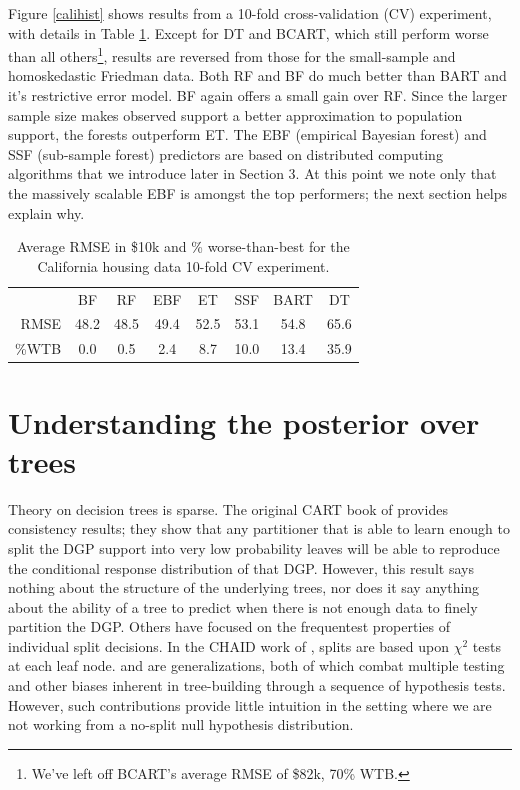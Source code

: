 \documentclass{article}
\begin{document}
Figure \ref{calihist} shows results from a 10-fold cross-validation (CV)
experiment, with details in Table \ref{calitab}.  
Except for DT and BCART, which still perform worse than all 
others\footnote{We've left off BCART's average RMSE of \$82k, 70\% WTB.},
 results are reversed from those for the small-sample and homoskedastic Friedman data.
Both RF and BF do much better than BART and it's
restrictive error model.   BF again offers a small
gain over RF.   Since the larger sample size makes observed support a better approximation to population support,  the forests outperform ET.  The EBF (empirical Bayesian forest) and SSF (sub-sample forest) predictors are based on distributed computing algorithms that we introduce later in Section 3.  At this point we note only that the massively scalable EBF is amongst the top performers; the next section helps explain why.


\begin{table}[h]\hspace{-.25cm}
{\footnotesize
\begin{tabular}{r|c c c c c c c}
&BF  &  RF &   EBF &  ET &   SSF &  BART & DT %
\\ \cline{2-8}\rule{0pt}{3ex}
RMSE &  48.2 &   48.5 &   49.4 &   52.5 &   53.1 &   54.8 &   65.6   %
\\ \%WTB & 0.0& 0.5& 2.4& 8.7&10.0&13.4&35.9%
\end{tabular}}
\caption{\label{calitab} Average RMSE in \$10k and \% worse-than-best 
 for the California housing data 10-fold CV experiment.}
\end{table}

    
    

\section{Understanding the posterior over trees}\label{treeuncertainty}


Theory on decision trees is sparse. The original CART book of
\citet{breiman_classification_1984} provides consistency results;
they show that any partitioner that is able to learn enough to
split the DGP support into very low probability leaves will be able to
reproduce the conditional response distribution of that DGP. However, this
result says nothing about the structure of the underlying trees, nor does it
say anything about the ability of a tree to predict when there is not enough
data to finely partition the DGP.  Others have focused on the frequentest
properties of individual split decisions. In the  CHAID work of
\citet{kass_exploratory_1980}, splits are based upon $\chi^2$ tests at each
leaf node. \citet{loh_regression_2002} and
\citet{hothorn_unbiased_2006} are generalizations, both of which
combat multiple testing and other biases inherent in tree-building through a
sequence of hypothesis tests. However, such contributions provide little
intuition  in the setting where we are not working from a no-split null
hypothesis distribution.
\end{document}
